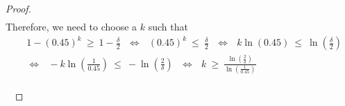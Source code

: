 \documentclass[twoside,11pt]{homework}
\DeclarePairedDelimiter{\2norm}{\lVert}{\rVert^2_2}
\newcommand{\1}[1]{\mathds{1}\left[#1\right]}
\begin{document}
\begin{proof}
\begin{align*}
\end{align*}
Therefore, we need to choose a $k$ such that
\begin{align*}
& 1 - (0.45)^k \ \geq \ 1 - \frac{\delta}{2} \ \ \ \Longleftrightarrow \ \ \ (0.45)^k \ \leq \ \frac{\delta}{2}
\ \ \ \Longleftrightarrow \ \ \ k\ln(0.45) \ \leq \ \ln\left(\frac{\delta}{2}\right)\\[0.5em]
& \Longleftrightarrow \ \ \ -k\ln\left(\frac{1}{0.45}\right) \ \leq \ -\ln\left(\frac{2}{\delta}\right) \ \ \ \Longleftrightarrow \ \ \ k \ \geq \ \frac{\ln\left(\frac{2}{\delta}\right)}{\ln\left(\frac{1}{0.45}\right)}
\end{align*}
\\\


\end{proof}
\end{document}
